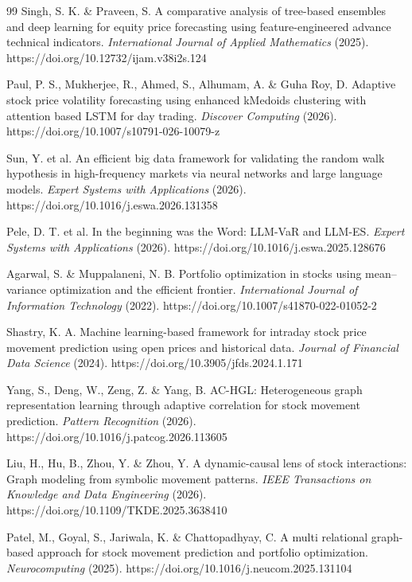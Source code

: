 \documentclass[fleqn,10pt]{wlscirep}
\begin{document}
\begin{thebibliography}{99}
Singh, S. K. \& Praveen, S. A comparative analysis of tree-based ensembles and deep learning for equity price forecasting using feature-engineered advance technical indicators. \textit{International Journal of Applied Mathematics} (2025). https://doi.org/10.12732/ijam.v38i2s.124

Paul, P. S., Mukherjee, R., Ahmed, S., Alhumam, A. \& Guha Roy, D. Adaptive stock price volatility forecasting using enhanced kMedoids clustering with attention based LSTM for day trading. \textit{Discover Computing} (2026). https://doi.org/10.1007/s10791-026-10079-z

Sun, Y. et al. An efficient big data framework for validating the random walk hypothesis in high-frequency markets via neural networks and large language models. \textit{Expert Systems with Applications} (2026). https://doi.org/10.1016/j.eswa.2026.131358

Pele, D. T. et al. In the beginning was the Word: LLM-VaR and LLM-ES. \textit{Expert Systems with Applications} (2026). https://doi.org/10.1016/j.eswa.2025.128676

Agarwal, S. \& Muppalaneni, N. B. Portfolio optimization in stocks using mean--variance optimization and the efficient frontier. \textit{International Journal of Information Technology} (2022). https://doi.org/10.1007/s41870-022-01052-2

Shastry, K. A. Machine learning-based framework for intraday stock price movement prediction using open prices and historical data. \textit{Journal of Financial Data Science} (2024). https://doi.org/10.3905/jfds.2024.1.171

Yang, S., Deng, W., Zeng, Z. \& Yang, B. AC-HGL: Heterogeneous graph representation learning through adaptive correlation for stock movement prediction. \textit{Pattern Recognition} (2026). https://doi.org/10.1016/j.patcog.2026.113605

Liu, H., Hu, B., Zhou, Y. \& Zhou, Y. A dynamic-causal lens of stock interactions: Graph modeling from symbolic movement patterns. \textit{IEEE Transactions on Knowledge and Data Engineering} (2026). https://doi.org/10.1109/TKDE.2025.3638410

Patel, M., Goyal, S., Jariwala, K. \& Chattopadhyay, C. A multi relational graph-based approach for stock movement prediction and portfolio optimization. \textit{Neurocomputing} (2025). https://doi.org/10.1016/j.neucom.2025.131104


\end{thebibliography}
\end{document}
